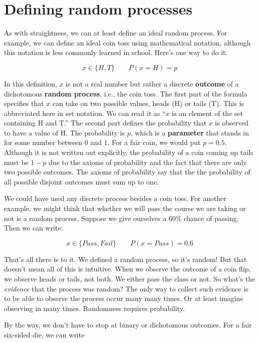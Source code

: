 \documentclass[
  openany]{book}
\begin{document}
\hypertarget{defining-random-processes}{%
\section{Defining random processes}\label{defining-random-processes}}

As with straightness, we can at least define an ideal random process. For example, we can define an ideal coin toss using mathematical notation, although this notation is less commonly learned in school. Here's one way to do it:

\[ x \in \{H, T\} \qquad P(x=H) = p\]

In this definition, \(x\) is not a real number but rather a discrete \textbf{outcome} of a dichotomous \textbf{random process}, i.e., the coin toss. The first part of the formula specifies that \(x\) can take on two possible values, heads (H) or tails (T). This is abbreviated here in set notation. We can read it as ``\(x\) is an element of the set containing H and T.'' The second part defines the probability that \(x\) is observed to have a value of H. The probability is \(p\), which is a \textbf{parameter} that stands in for some number between 0 and 1. For a fair coin, we would put \(p=0.5\). Although it is not written out explicitly, the probability of a coin coming up tails must be \(1-p\) due to the axioms of probability and the fact that there are only two possible outcomes. The axioms of probability say that the the probability of all possible disjoint outcomes must sum up to one.

We could have used any discrete process besides a coin toss. For another example, we might think that whether we will pass the course we are taking or not is a random process. Suppose we give ourselves a 60\% chance of passing. Then we can write:

\[ x \in \{Pass, Fail\} \qquad P(x=Pass) = 0.6\]

That's all there is to it. We defined a random process, so it's random! But that doesn't mean all of this is intuitive. When we observe the outcome of a coin flip, we observe heads or tails, not both. We either pass the class or not. So what's the \emph{evidence} that the process was random? The only way to collect such evidence is to be able to observe the process occur many many times. Or at least imagine observing in many times. Randomness requires probability.

By the way, we don't have to stop at binary or dichotomous outcomes. For a fair six-sided die, we can write
\end{document}
